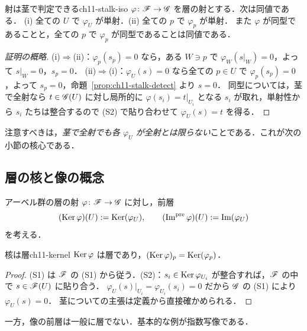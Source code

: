 \begin{myprop}{射は茎で判定できる}{ch11-stalk-iso}
$\varphi\colon\mathscr{F}\to\mathscr{G}$ を層の射とする．次は同値である．
(i) 全ての $U$ で $\varphi_U$ が単射．(ii) 全ての $p$ で $\varphi_p$ が単射．
また $\varphi$ が同型であることと，全ての $p$ で $\varphi_p$ が同型であることは同値である．
\end{myprop}
\begin{proof}[証明の概略]
(i)$\Rightarrow$(ii)：$\varphi_p(s_p)=0$ なら，ある $W\ni p$ で $\varphi_W(s|_W)=0$，よって $s|_W=0$，$s_p=0$．
(ii)$\Rightarrow$(i)：$\varphi_U(s)=0$ なら全ての $p\in U$ で $\varphi_p(s_p)=0$，よって $s_p=0$，命題~\ref{prop:ch11-stalk-detect} より $s=0$．
同型については，茎で全射なら $t\in\mathscr{G}(U)$ に対し局所的に $\varphi(s_i)=t|_{U_i}$ となる $s_i$ が取れ，単射性から $s_i$ たちは整合するので (S2) で貼り合わせて $\varphi_U(s)=t$ を得る．
\end{proof}

注意すべきは，\emph{茎で全射でも各 $\varphi_U$ が全射とは限らない}ことである．これが次の小節の核心である．

\subsection{層の核と像の概念}

アーベル群の層の射 $\varphi\colon\mathscr{F}\to\mathscr{G}$ に対し，前層
\[
  (\operatorname{Ker}\varphi)(U) := \operatorname{Ker}(\varphi_U),\qquad
  (\operatorname{Im}^{\mathrm{pre}}\varphi)(U) := \operatorname{Im}(\varphi_U)
\]
を考える．

\begin{myprop}{核は層}{ch11-kernel}
$\operatorname{Ker}\varphi$ は層であり，$(\operatorname{Ker}\varphi)_p=\operatorname{Ker}(\varphi_p)$．
\end{myprop}
\begin{proof}
(S1) は $\mathscr{F}$ の (S1) から従う．(S2)：$s_i\in\operatorname{Ker}\varphi_{U_i}$ が整合すれば，$\mathscr{F}$ の中で $s\in\mathscr{F}(U)$ に貼り合う．
$\varphi_U(s)|_{U_i}=\varphi_{U_i}(s_i)=0$ だから $\mathscr{G}$ の (S1) により $\varphi_U(s)=0$．
茎についての主張は定義から直接確かめられる．
\end{proof}

一方，像の前層は一般に層でない．基本的な例が指数写像である．

